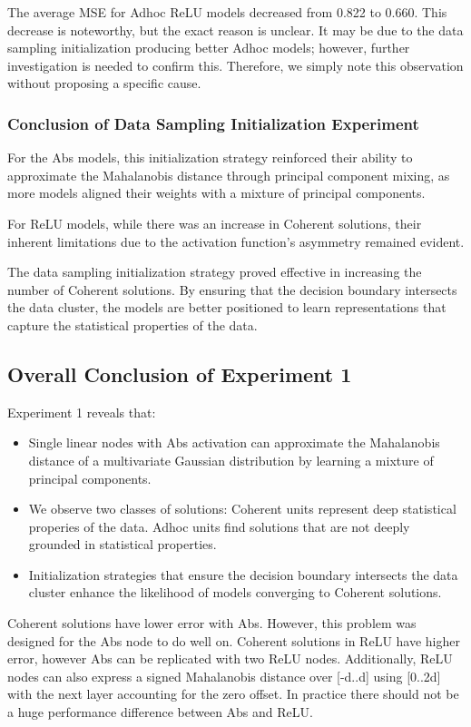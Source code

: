 The average MSE for Adhoc ReLU models decreased from 0.822 to 0.660. This decrease is noteworthy, but the exact reason is unclear. It may be due to the data sampling initialization producing better Adhoc models; however, further investigation is needed to confirm this. Therefore, we simply note this observation without proposing a specific cause.

\subsubsection{Conclusion of Data Sampling Initialization Experiment}

For the Abs models, this initialization strategy reinforced their ability to approximate the Mahalanobis distance through principal component mixing, as more models aligned their weights with a mixture of principal components.

For ReLU models, while there was an increase in Coherent solutions, their inherent limitations due to the activation function's asymmetry remained evident. 

The data sampling initialization strategy proved effective in increasing the number of Coherent solutions. By ensuring that the decision boundary intersects the data cluster, the models are better positioned to learn representations that capture the statistical properties of the data.

\subsection{Overall Conclusion of Experiment 1}

Experiment 1 reveals that:

\begin{itemize}
    \item Single linear nodes with Abs activation can approximate the Mahalanobis distance of a multivariate Gaussian distribution by learning a mixture of principal components.
    \item We observe two classes of solutions: Coherent units represent deep statistical properies of the data. Adhoc units find solutions that are not deeply grounded in statistical properties.
    \item Initialization strategies that ensure the decision boundary intersects the data cluster enhance the likelihood of models converging to Coherent solutions.
\end{itemize}

Coherent solutions have lower error with Abs. However, this problem was designed for the Abs node to do well on. Coherent solutions in ReLU have higher error, however Abs can be replicated with two ReLU nodes. Additionally, ReLU nodes can also express a signed Mahalanobis distance over [-d..d] using [0..2d] with the next layer accounting for the zero offset. In practice there should not be a huge performance difference between Abs and ReLU.

